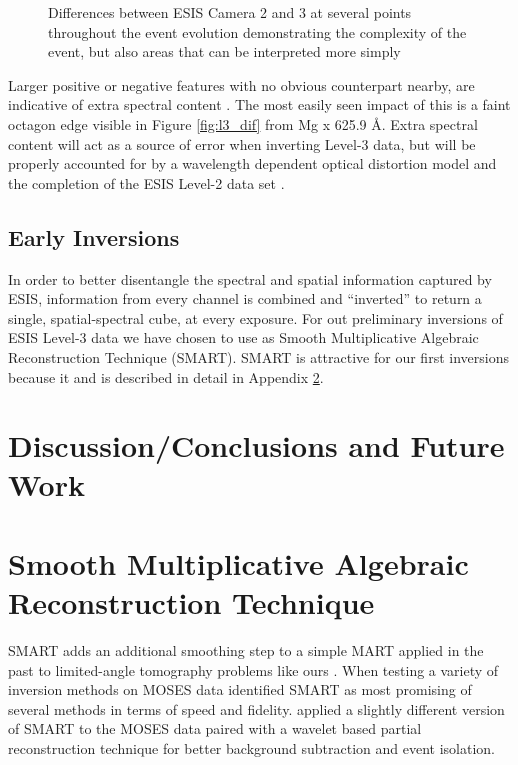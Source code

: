     	\begin{figure}[htb!]
    		\centering
    		\caption{Differences between ESIS Camera 2 and 3 at several points throughout the event evolution demonstrating the complexity of the event, but also areas that can be interpreted more simply}
    		\label{fig:main_event}
    	\end{figure}
    	
    	Larger positive or negative features with no obvious counterpart nearby, are indicative of extra spectral content \citep{RustPhD,Parker2021}.
    	The most easily seen impact of this is a faint octagon edge visible in Figure \ref{fig:l3_dif} from Mg {\sc x} 625.9 \AA.
    	Extra spectral content will act as a source of error when inverting Level-3 data, but will be properly accounted for by a wavelength dependent optical distortion model and the completion of the ESIS Level-2 data set \citep{Smart2022}. 	
    
    
    
    \subsection{Early Inversions}
    	In order to better disentangle the spectral and spatial information captured by ESIS, information from every channel is combined and ``inverted'' to return a single, spatial-spectral cube, at every exposure.
    	For out preliminary inversions of ESIS Level-3 data we have chosen to use as Smooth Multiplicative Algebraic Reconstruction Technique (SMART).
    	SMART is attractive for our first inversions because it  and is described in detail in Appendix \ref{SMART}.
    	
    	
    	
    			
    		   	
    	
\section{Discussion/Conclusions and Future Work}





\appendix
\section{Smooth Multiplicative Algebraic Reconstruction Technique}\label{SMART}
	SMART adds an additional smoothing step to a simple MART applied in the past to limited-angle tomography problems like ours \citep{Okamoto1991,Verhoeven1993}.
	When testing a variety of inversion methods on MOSES data \citet{FoxPhD} identified SMART as most promising of several methods in terms of speed and fidelity.
	\citet{RustPhD} applied a slightly different version of SMART to the MOSES data paired with a wavelet based partial reconstruction technique for better background subtraction and event isolation.
	
